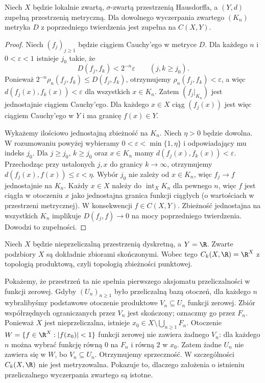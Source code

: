 \begin{twierdzenie}
\label{thm:topog-odwzorowania-zupelnosc}
Niech $X$ będzie lokalnie zwartą,
$\sigma$-zwartą przestrzenią Hausdorffa,
a $(Y,d)$ zupełną przestrzenią metryczną.
Dla dowolnego wyczerpania zwartego
$(K_n)$ metryka $D$ z poprzedniego
twierdzenia jest zupełna na $C(X,Y)$.
\end{twierdzenie}
\begin{proof}
Niech $(f_j)_{j\ge1}$ będzie ciągiem
Cauchy'ego w metryce $D$.
Dla każdego $n$ i $0<\varepsilon<1$
istnieje $j_0$ takie, że
\[
D(f_j,f_k)<2^{-n}\varepsilon
\qquad(j,k\ge j_0).
\]
Ponieważ $2^{-n}\rho_n(f_j,f_k)
\le D(f_j,f_k)$, otrzymujemy
$\rho_n(f_j,f_k)<\varepsilon$,
a więc
$d(f_j(x),f_k(x))<\varepsilon$
dla wszystkich $x\in K_n$.
Zatem $(f_j|_{K_n})$ jest
jednostajnie ciągiem Cauchy'ego.
Dla każdego $x\in X$ ciąg
$(f_j(x))$ jest więc ciągiem
Cauchy'ego w $Y$ i ma granicę
$f(x)\in Y$.

Wykażemy ilościowo jednostajną
zbieżność na $K_n$. Niech
$\eta>0$ będzie dowolna.
W rozumowaniu powyżej wybieramy
$0<\varepsilon<\min\{1,\eta\}$
i odpowiadający mu indeks $j_0$.
Dla $j\ge j_0$, $k\ge j_0$
oraz $x\in K_n$ mamy
$d(f_j(x),f_k(x))<\varepsilon$.
Przechodząc przy ustalonych $j,x$
do granicy $k\to\infty$,
otrzymujemy
$d(f_j(x),f(x))\le\varepsilon<\eta$.
Wybór $j_0$ nie zależy od $x\in K_n$,
więc $f_j\to f$ jednostajnie na $K_n$.
Każdy $x\in X$ należy do
$\operatorname{int}_X K_n$
dla pewnego $n$, więc $f$
jest ciągła w otoczeniu $x$
jako jednostajna granica funkcji
ciągłych (o wartościach w przestrzeni
metrycznej). W konsekwencji
$f\in C(X,Y)$.
Zbieżność jednostajna na wszystkich
$K_n$ implikuje $D(f_j,f)\to0$
na mocy poprzedniego twierdzenia.
Dowodzi to zupełności.
\end{proof}

\begin{przyklad}
\label{ex:topog-odwzorowania-nieprzeliczalna}
Niech $X$ będzie nieprzeliczalną
przestrzenią dyskretną, a $Y=\R$.
Zwarte podzbiory $X$ są dokładnie
zbiorami skończonymi. Wobec tego
$C_k(X,\R)=\R^X$ z topologią
produktową, czyli topologią
zbieżności punktowej.

Pokażemy, że przestrzeń ta
nie spełnia pierwszego aksjomatu
przeliczalności w funkcji zerowej.
Gdyby $(U_n)_{n\ge1}$ było
przeliczalną bazą otoczeń,
dla każdego $n$ wybralibyśmy
podstawowe otoczenie produktowe
$V_n\subseteq U_n$ funkcji zerowej.
Zbiór współrzędnych ograniczanych
przez $V_n$ jest skończony;
oznaczmy go przez $F_n$.
Ponieważ $X$ jest nieprzeliczalna,
istnieje $x_0\in X\setminus
\bigcup_{n\ge1}F_n$.
Otoczenie
$W=\{f\in\R^X:|f(x_0)|<1\}$
funkcji zerowej nie zawiera
żadnego $V_n$: dla każdego $n$
można wybrać funkcję równą $0$
na $F_n$ i równą $2$ w $x_0$.
Zatem żadne $U_n$ nie zawiera się
w $W$, bo $V_n\subseteq U_n$.
Otrzymujemy sprzeczność.
W szczególności $C_k(X,\R)$
nie jest metryzowalna.
Pokazuje to, dlaczego założenia
o istnieniu przeliczalnego
wyczerpania zwartego są istotne.
\end{przyklad}

